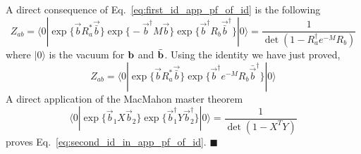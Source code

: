 A direct consequence of Eq.~\eqref{eq:first_id_app_pf_of_id} is the following
\begin{equation}
\label{eq:second_id_in_app_pf_of_id}
Z_{ab} = \langle 0 | \exp\Big\{ \vec{b} R_a^* \vec{\bar{b}}\Big\} \exp\Big\{ - \vec{b}^{\dagger} M  \vec{b} \Big\}   \exp\Big\{  \vec{b}^{\dagger} R_b  \vec{\bar{b}}^{\dagger}\Big\}  |0  \rangle  = \frac{1}{\det( 1- R_a^{\dagger} e^{-M} R_b )} 
\end{equation}
where $|0\rangle$ is the vacuum for ${\bf b}$ and $\bar{\bf b}$. Using the identity we have just proved, 
\begin{equation}
Z_{ab} =   \langle 0 | \exp\Big\{ \vec{b} R_a^* \vec{\bar{b}}\Big\}  \exp \Big\{ \vec{b}^{\dagger} e^{-M}  R_b \bar{\vec{b}}^{\dagger}  \Big\}  |0 \rangle 
\end{equation}
A direct application of the MacMahon master theorem
\begin{equation}
  \langle 0 | \exp \Big\{ \vec{b}_1 X \vec{b}_2 \Big\}  \exp \Big\{ \vec{b}^{\dagger}_1 Y \vec{b}^{\dagger}_2 \Big\}|0  \rangle 
 = \frac{1}{\det(1 - X^T Y )}
\end{equation}
proves Eq.~\eqref{eq:second_id_in_app_pf_of_id}. \hfill$\blacksquare$


